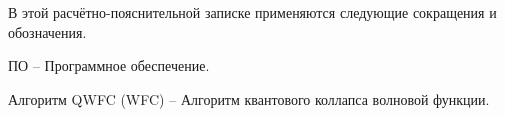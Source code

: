 
В этой расчётно-пояснительной записке применяются следующие сокращения и обозначения.

ПО -- Программное обеспечение.

Алгоритм QWFC (WFC) -- Алгоритм квантового коллапса волновой функции.

\pagebreak